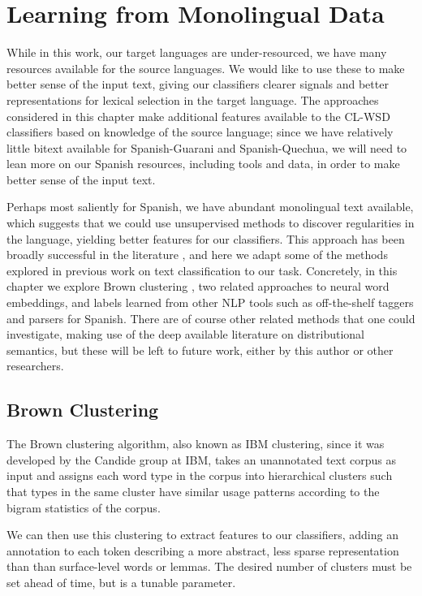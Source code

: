 \chapter{Learning from Monolingual Data}
\label{chap:monolingual}
While in this work, our target languages are under-resourced, we have many
resources available for the source languages. We would like to use these to
make better sense of the input text, giving our classifiers clearer signals and
better representations for lexical selection in the target language.
The approaches considered in this chapter make additional features available to
the CL-WSD classifiers based on knowledge of the source language;
since we have relatively little bitext available for Spanish-Guarani
and Spanish-Quechua, we will need to lean more on our Spanish resources,
including tools and data, in order to make better sense of the input text.

Perhaps most saliently for Spanish, we have abundant monolingual text
available, which suggests that we could use unsupervised methods to discover
regularities in the language, yielding better features for our classifiers.
This approach has been broadly successful in the literature
\cite{turian-ratinov-bengio:2010:ACL}
, and here we adapt some of the methods explored in previous work on text
classification to our task. Concretely, in this chapter we explore Brown
clustering \cite{brown1992class}, two related approaches to neural word
embeddings, and labels learned from other NLP tools such as off-the-shelf
taggers and parsers for Spanish.  There are of course other related methods
that one could investigate, making use of the deep available literature on
distributional semantics, but these will be left to future work, either by this
author or other researchers.

\section{Brown Clustering}
The Brown clustering algorithm, also known as IBM clustering, since it was
developed by the Candide group at IBM, takes an unannotated text corpus as
input and assigns each word type in the corpus into hierarchical clusters such
that types in the same cluster have similar usage patterns according to the
bigram statistics of the corpus.

We can then use this clustering to extract features to our classifiers, adding
an annotation to each token describing a more abstract, less sparse
representation than than surface-level words or lemmas. The desired
number of clusters must be set ahead of time, but is a tunable parameter.

